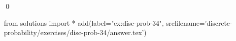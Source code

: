 
\begin{ex} 
  \label{ex:disc-prob-34}
  
  \qed
\end{ex} 
\begin{python0}
from solutions import *
add(label="ex:disc-prob-34",
    srcfilename='discrete-probability/exercises/disc-prob-34/answer.tex') 
\end{python0}
